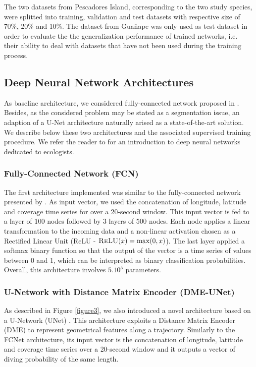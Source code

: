 \documentclass{article}
\begin{document}
The two datasets from Pescadores Island, corresponding to the two study species,  were splitted into training, validation and test datasets with respective size of 70\%, 20\% and 10\%. The dataset from Guañape was only used as test dataset in order to evaluate the the generalization performance of trained networks, i.e. their ability to deal with datasets that have not been used during the training process.

\subsection{Deep Neural Network Architectures}

As baseline architecture, we considered fully-connected network proposed in \citep{browning_predicting_2018}. Besides, as the considered problem may be stated as a segmentation issue, an adaption of a U-Net architecture naturally arised as a state-of-the-art solution. We describe below these two architectures and the associated supervised training procedure. We refer the reader to \citep{christin_applications_2019} for an introduction to deep neural networks dedicated to ecologists.

\subsubsection{Fully-Connected Network (FCN)}
The first architecture implemented was similar to the fully-connected network presented by \citep{browning_predicting_2018}. As input vector, we used the concatenation of longitude, latitude and coverage time series for over a 20-second window. This input vector is fed to a layer of 100 nodes followed by 3 layers of 500 nodes. Each node applies a linear transformation to the incoming data and a non-linear activation chosen as a Rectified Linear Unit (ReLU - $\textsc{ReLU}(x) = \max(0,x)$). The last layer applied a softmax binary function so that the output of the vector is a time series of values between  0 and 1, which can be interpreted as binary classification probabilities. Overall, this architecture involves $5.10^{5}$ parameters.

\subsubsection{U-Network with Distance Matrix Encoder (DME-UNet)}
As described in Figure \ref{figure3}, we also introduced a novel architecture based on a U-Network (UNet)  \citep{ronneberger_u-net_2015}. This architecture exploits a 
Distance Matrix Encoder (DME) to represent geometrical features along a trajectory.
Similarly to the FCNet architecture, its input vector is the concatenation of longitude, latitude and coverage time series over a 20-second window and it outputs a vector of diving probability of the same length.
\end{document}
